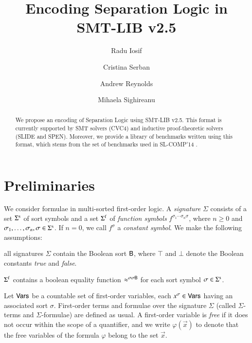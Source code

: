\documentclass{llncs}
\begin{document}

\title{Encoding Separation Logic in SMT-LIB v2.5}

\author{Radu Iosif \and Cristina Serban \and Andrew Reynolds \and Mihaela Sighireanu} 


\maketitle

\begin{abstract}
  We propose an encoding of Separation Logic using SMT-LIB v2.5. This
  format is currently supported by SMT solvers (CVC4) and inductive
  proof-theoretic solvers (SLIDE and SPEN). Moreover, we provide a
  library of benchmarks written using this format, which stems from
  the set of benchmarks used in SL-COMP'14 \cite{sl-comp14}.
\end{abstract}

\section{Preliminaries}

We consider formulae in multi-sorted first-order logic.  A
\emph{signature} $\Sigma$ consists of a set $\Sigma^\mathrm{s}$ of sort
symbols and a set $\Sigma^\mathrm{f}$ of \emph{function symbols}
$f^{\sigma_1 \cdots \sigma_n \sigma}$, where $n \geq 0$ and $\sigma_1,
\ldots, \sigma_n, \sigma \in \Sigma^\mathrm{s}$. If $n=0$, we call
$f^\sigma$ a \emph{constant symbol}. We make the following
assumptions:
\begin{compactenum}
\item all signatures $\Sigma$ contain the Boolean sort $\mathsf{B}$, where
  $\top$ and $\bot$ denote the Boolean constants \emph{true} and
  \emph{false}. 
\item $\Sigma^\mathrm{f}$ contains a boolean equality function
  $\approx^{\sigma\sigma\mathsf{B}}$ for each sort symbol
  $\sigma\in\Sigma^\mathrm{s}$.
\end{compactenum}

Let $\mathsf{Vars}$ be a countable set of first-order variables, each
$x^\sigma \in \mathsf{Vars}$ having an associated sort $\sigma$. First-order
terms and formulae over the signature $\Sigma$ (called $\Sigma$-terms
and $\Sigma$-formulae) are defined as usual. A first-order variable is
\emph{free} if it does not occur within the scope of a quantifier, and
we write $\varphi(\vec{x})$ to denote that the free variables of the
formula $\varphi$ belong to the set $\vec{x}$. 
\end{document}
